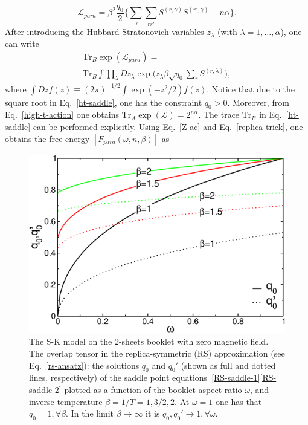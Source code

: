 \documentclass[twocolumn,superscriptaddress,prb,10pt]{revtex4-1}
\def\tr{\textrm{Tr}}
\begin{document}
%
\begin{equation}
\label{high-t-action}
{\mathcal L}_{para}=\beta^2\frac{q_0}{2}\Big\{\sum_\gamma\sum_{rr'}S^{(r,
\gamma)}S^{(r',\gamma)}-n\alpha\Big\}.
\end{equation}
%
After introducing the Hubbard-Stratonovich variables $z_\lambda$ (with 
$\lambda=1,\dots,\alpha$), one can write 
%
\begin{multline}
\label{ht-saddle}
\textrm{Tr}_B\exp({\mathcal L}_{para})=\\\tr_B\int\prod_\lambda Dz_{\lambda}
\exp\Big(z_\lambda\beta\sqrt{q_0}\sum_r S^{(r,\lambda)}\Big),
\end{multline}
%
where $\int Dz f(z)\equiv(2\pi)^{-1/2}\int\exp(-z^2/2)f(z)$. Notice that 
due to the square root in Eq.~\eqref{ht-saddle}, one has the constraint 
$q_0>0$. Moreover, from Eq.~\eqref{high-t-action} 
one obtains $\textrm{Tr}_A\exp({\mathcal L})=2^{n\alpha}$. The trace 
$\textrm{Tr}_B$ in Eq.~\eqref{ht-saddle} can be performed explicitly. 
Using Eq.~\eqref{Z-ac} and Eq.~\eqref{replica-trick}, one obtains 
the free energy $[F_{para}(\omega,n,\beta)]$ as  
%
\begin{figure}[t]
\includegraphics*[width=0.9\linewidth]{./draft_figs/RSB0_saddle}
\caption{\label{RSB0-saddle}
 The S-K model on the $2$-sheets booklet with zero magnetic field. The 
 overlap tensor in the replica-symmetric (RS) approximation (see Eq.~\eqref{rs-ansatz}): 
 the solutions $q_0$ and $q_0'$ (shown as full and dotted lines, respectively) 
 of the saddle point equations~\eqref{RS-saddle-1}\eqref{RS-saddle-2} 
 plotted as a function of the booklet aspect ratio $\omega$, and inverse 
 temperature $\beta=1/T=1,3/2,2$. At $\omega=1$ one has that $q_0=1,
 \forall\beta$. In the limit $\beta\to\infty$ it is $q_0,q_0'\to 1,\forall
 \omega$.
}
\label{RSB0_saddle}
\end{figure}
\end{document}
